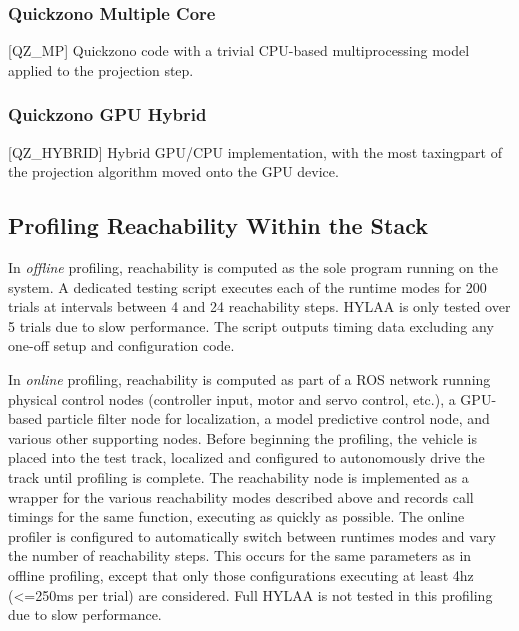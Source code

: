 \documentclass[runningheads]{llncs}
\begin{document}
\subsubsection{Quickzono Multiple Core} [QZ\_MP] \newline Quickzono code with a trivial CPU-based multiprocessing model \newline applied to the projection step. 
\vspace*{-5pt}
\subsubsection{Quickzono GPU Hybrid} [QZ\_HYBRID] \newline Hybrid GPU/CPU implementation, with the most taxing\newline part of the projection algorithm moved onto the GPU device. 
\vspace*{-5pt}

\subsection{Profiling Reachability Within the Stack}

In \textit{offline} profiling, reachability is computed as the sole program running on the system. A dedicated testing script executes each of the runtime modes for 200 trials at intervals between 4 and 24 reachability steps. HYLAA is only tested over 5 trials due to slow performance. 
The script outputs timing data excluding any one-off setup and configuration code.

In \textit{online} profiling, reachability is computed as part of a ROS network running physical control nodes (controller input, motor and servo control, etc.), a GPU-based particle filter node for localization, a model predictive control node, and various other supporting nodes. 
Before beginning the profiling, the vehicle is placed into the test track, localized and configured to autonomously drive the track until profiling is complete. 
The reachability node is implemented as a wrapper for the various reachability modes described above and records call timings for the same function, executing as quickly as possible. 
The online profiler is configured to automatically switch between runtimes modes and vary the number of reachability steps. This occurs for the same parameters as in offline profiling, except that only those configurations executing at least 4hz (<=250ms per trial) are considered. Full HYLAA is not tested in this profiling due to slow performance.
\end{document}
